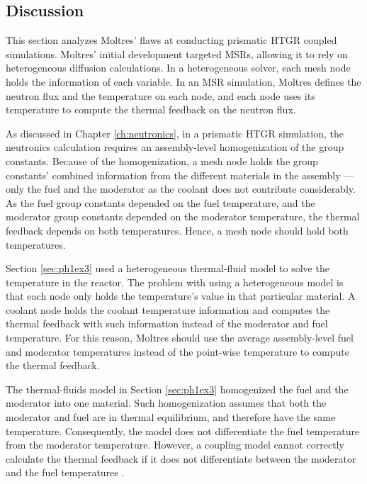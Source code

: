 \subsection{Discussion}
\label{sec:discuss}

This section analyzes Moltres' flaws at conducting prismatic HTGR coupled simulations.
Moltres' initial development targeted MSRs, allowing it to rely on heterogeneous diffusion calculations.
In a heterogeneous solver, each mesh node holds the information of each variable.
In an MSR simulation, Moltres defines the neutron flux and the temperature on each node, and each node uses its temperature to compute the thermal feedback on the neutron flux.

As discussed in Chapter \ref{ch:neutronics}, in a prismatic HTGR simulation, the neutronics calculation requires an assembly-level homogenization of the group constants.
Because of the homogenization, a mesh node holds the group constants' combined information from the different materials in the assembly --- only the fuel and the moderator as the coolant does not contribute considerably.
As the fuel group constants depended on the fuel temperature, and the moderator group constants depended on the moderator temperature, the thermal feedback depends on both temperatures.
Hence, a mesh node should hold both temperatures.

Section \ref{sec:ph1ex3} used a heterogeneous thermal-fluid model to solve the temperature in the reactor.
The problem with using a heterogeneous model is that each node only holds the temperature's value in that particular material.
A coolant node holds the coolant temperature information and computes the thermal feedback with such information instead of the moderator and fuel temperature.
For this reason, Moltres should use the average assembly-level fuel and moderator temperatures instead of the point-wise temperature to compute the thermal feedback.

The thermal-fluids model in Section \ref{sec:ph1ex3} homogenized the fuel and the moderator into one material.
Such homogenization assumes that both the moderator and fuel are in thermal equilibrium, and therefore have the same temperature.
Consequently, the model does not differentiate the fuel temperature from the moderator temperature.
However, a coupling model cannot correctly calculate the thermal feedback if it does not differentiate between the moderator and the fuel temperatures \cite{damian_vhtr_2008}.

